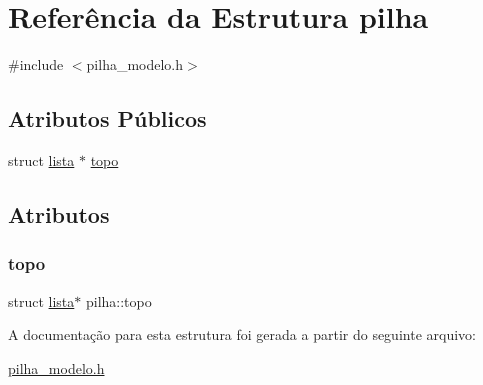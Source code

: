 \hypertarget{structpilha}{}\section{Referência da Estrutura pilha}
\label{structpilha}


{\ttfamily \#include $<$pilha\+\_\+modelo.\+h$>$}

\subsection*{Atributos Públicos}
\begin{DoxyCompactItemize}
\item 
struct \hyperlink{structlista}{lista} $\ast$ \hyperlink{structpilha_af710a80cc659420807a4e273fba075a1}{topo}
\end{DoxyCompactItemize}


\subsection{Atributos}
\mbox{\label{structpilha_af710a80cc659420807a4e273fba075a1}} 
\subsubsection{\texorpdfstring{topo}{topo}}
{\footnotesize\ttfamily struct \hyperlink{structlista}{lista}$\ast$ pilha\+::topo}



A documentação para esta estrutura foi gerada a partir do seguinte arquivo\+:\begin{DoxyCompactItemize}
\item 
\hyperlink{pilha__modelo_8h}{pilha\+\_\+modelo.\+h}\end{DoxyCompactItemize}
